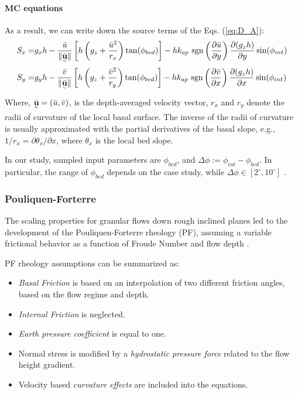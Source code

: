 \documentclass{article}
\begin{document}
\paragraph{MC equations} As a result, we can write down the source terms of the Eqs. (\ref{eq:D_A}):
\begin{eqnarray}\label{S_terms_MC}
S_x =& g_x h  - \frac{\bar{u}}{\| \underset{^\sim}{\bar{\textbf u}} \|} \left[h\left(g_z+\frac{\bar{u}^2}{r_x}\right)\tan(\phi_{bed})\right] - h k_{ap} \ {\rm sgn}\left(\frac{\partial \bar{u}}{\partial y}\right) \frac{\partial (g_z h)}{\partial y} \sin(\phi_{int}) \nonumber \\
 S_y =& g_y h  - \frac{\bar{v}}{\| \underset{^\sim}{\bar{\textbf u}} \|} \left[h\left(g_z +\frac{\bar{v}^2}{r_y}\right)\tan(\phi_{bed})\right] - h k_{ap} \ {\rm sgn}\left({\frac{\partial \bar{v}}{\partial x}}\right) \frac{\partial (g_z h)}{\partial x} \sin(\phi_{int})
\end{eqnarray}
Where, $\underset{^\sim}{\bar{\textbf u}} = (\bar{u} , \bar{v})$, is the depth-averaged velocity vector, $r_x$ and $r_y$ denote the radii of curvature
of the local basal surface. The inverse of the radii of curvature is usually approximated with the partial derivatives of the basal slope, e.g., $1/r_x = \partial \theta_x/\partial x$, where $\theta_x$ is the local bed slope.

In our study, sampled input parameters are $\phi_{bed}$, and $\Delta \phi:=\phi_{int}-\phi_{bed}$. In particular, the range of $\phi_{bed}$ depends on the case study, while $\Delta \phi \in [2^{\mathrm{\circ}}, 10^{\mathrm{\circ}}]$ \citep{Dalbey2008}.

\subsubsection{Pouliquen-Forterre}\label{PFM}
The scaling properties for granular flows down rough inclined planes led to the development of the Pouliquen-Forterre rheology (PF), assuming a variable frictional behavior as a function of Froude Number and flow depth \citep{Pouliquen1999, ForterrePouliquen2002, PouliquenForterre2002, ForterrePouliquen2003}.

PF rheology assumptions can be summarized as:
\begin{itemize}
\item \textit{Basal Friction} is based on an interpolation of two different friction angles, based on the flow regime and depth.

\item \textit{Internal Friction} is neglected.

\item \textit{Earth pressure coefficient} is equal to one.

\item Normal stress is modified by a \textit{hydrostatic pressure force} related to the flow height gradient.

\item Velocity based \textit{curvature effects} are included into the equations.
\end{itemize}
\end{document}
